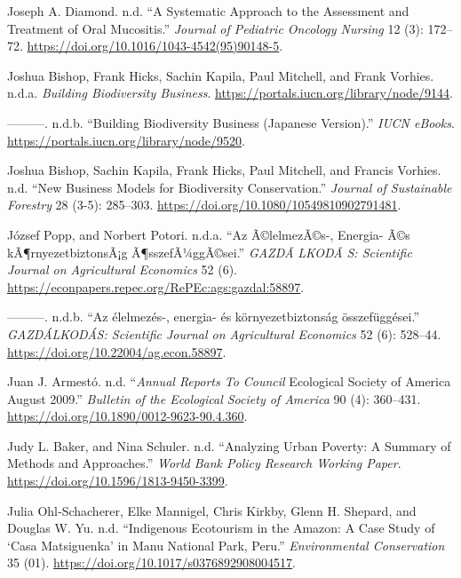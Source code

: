 \begin{CSLReferences}{1}{0}
Joseph A. Diamond. n.d. {``A Systematic Approach to the Assessment and
Treatment of Oral Mucositis.''} \emph{Journal of Pediatric Oncology
Nursing} 12 (3): 172--72.
\url{https://doi.org/10.1016/1043-4542(95)90148-5}.

Joshua Bishop, Frank Hicks, Sachin Kapila, Paul Mitchell, and Frank
Vorhies. n.d.a. \emph{Building Biodiversity Business}.
\url{https://portals.iucn.org/library/node/9144}.

---------. n.d.b. {``Building Biodiversity Business (Japanese
Version).''} \emph{IUCN eBooks}.
\url{https://portals.iucn.org/library/node/9520}.

Joshua Bishop, Sachin Kapila, Frank Hicks, Paul Mitchell, and Francis
Vorhies. n.d. {``New Business Models for Biodiversity Conservation.''}
\emph{Journal of Sustainable Forestry} 28 (3-5): 285--303.
\url{https://doi.org/10.1080/10549810902791481}.

József Popp, and Norbert Potori. n.d.a. {``Az Ã©lelmezÃ©s-, Energia- Ã©s
kÃ¶rnyezetbiztonsÃ¡g Ã¶sszefÃ¼ggÃ©sei.''} \emph{GAZDÃ LKODÃ S:
Scientific Journal on Agricultural Economics} 52 (6).
\url{https://econpapers.repec.org/RePEc:ags:gazdal:58897}.

---------. n.d.b. {``Az élelmezés-, energia- és környezetbiztonság
összefüggései.''} \emph{GAZDÁLKODÁS: Scientific Journal on Agricultural
Economics} 52 (6): 528--44.
\url{https://doi.org/10.22004/ag.econ.58897}.

Juan J. Armestó. n.d. {``\emph{Annual Reports To Council} Ecological
Society of America August 2009.''} \emph{Bulletin of the Ecological
Society of America} 90 (4): 360--431.
\url{https://doi.org/10.1890/0012-9623-90.4.360}.

Judy L. Baker, and Nina Schuler. n.d. {``Analyzing Urban Poverty: A
Summary of Methods and Approaches.''} \emph{World Bank Policy Research
Working Paper}. \url{https://doi.org/10.1596/1813-9450-3399}.

Julia Ohl‐Schacherer, Elke Mannigel, Chris Kirkby, Glenn H. Shepard, and
Douglas W. Yu. n.d. {``Indigenous Ecotourism in the Amazon: A Case Study
of {`Casa Matsiguenka'} in Manu National Park, Peru.''}
\emph{Environmental Conservation} 35 (01).
\url{https://doi.org/10.1017/s0376892908004517}.


\end{CSLReferences}
